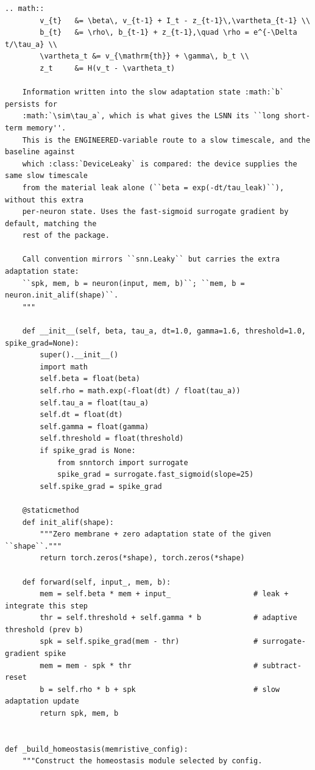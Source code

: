 \begin{lstlisting}[caption={mnn\_torch/models.py},label={lst:mnn-src-models}]
    .. math::
        v_{t}   &= \beta\, v_{t-1} + I_t - z_{t-1}\,\vartheta_{t-1} \\
        b_{t}   &= \rho\, b_{t-1} + z_{t-1},\quad \rho = e^{-\Delta t/\tau_a} \\
        \vartheta_t &= v_{\mathrm{th}} + \gamma\, b_t \\
        z_t     &= H(v_t - \vartheta_t)

    Information written into the slow adaptation state :math:`b` persists for
    :math:`\sim\tau_a`, which is what gives the LSNN its ``long short-term memory''.
    This is the ENGINEERED-variable route to a slow timescale, and the baseline against
    which :class:`DeviceLeaky` is compared: the device supplies the same slow timescale
    from the material leak alone (``beta = exp(-dt/tau_leak)``), without this extra
    per-neuron state. Uses the fast-sigmoid surrogate gradient by default, matching the
    rest of the package.

    Call convention mirrors ``snn.Leaky`` but carries the extra adaptation state:
    ``spk, mem, b = neuron(input, mem, b)``; ``mem, b = neuron.init_alif(shape)``.
    """

    def __init__(self, beta, tau_a, dt=1.0, gamma=1.6, threshold=1.0, spike_grad=None):
        super().__init__()
        import math
        self.beta = float(beta)
        self.rho = math.exp(-float(dt) / float(tau_a))
        self.tau_a = float(tau_a)
        self.dt = float(dt)
        self.gamma = float(gamma)
        self.threshold = float(threshold)
        if spike_grad is None:
            from snntorch import surrogate
            spike_grad = surrogate.fast_sigmoid(slope=25)
        self.spike_grad = spike_grad

    @staticmethod
    def init_alif(shape):
        """Zero membrane + zero adaptation state of the given ``shape``."""
        return torch.zeros(*shape), torch.zeros(*shape)

    def forward(self, input_, mem, b):
        mem = self.beta * mem + input_                   # leak + integrate this step
        thr = self.threshold + self.gamma * b            # adaptive threshold (prev b)
        spk = self.spike_grad(mem - thr)                 # surrogate-gradient spike
        mem = mem - spk * thr                            # subtract-reset
        b = self.rho * b + spk                           # slow adaptation update
        return spk, mem, b


def _build_homeostasis(memristive_config):
    """Construct the homeostasis module selected by config.


\end{lstlisting}
